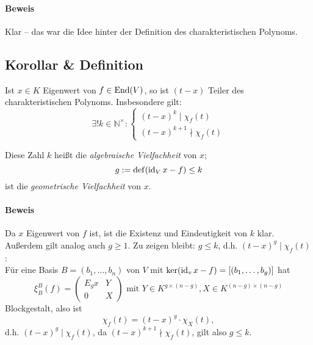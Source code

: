 \paragraph{Beweis}
	Klar -- das war die Idee hinter der Definition des charakteristischen Polynoms.
\subsection{Korollar \& Definition}
\begin{Korollar}
	Ist $ x\in K $ Eigenwert von $ f\in\operatorname{End}(V) $, so ist $ (t-x) $ Teiler des charakteristischen Polynoms. Insbesondere gilt:
		\[ \exists!k\in \mathbb{N}^\times:
			\begin{cases}
				(t-x)^k\mid \chi_f(t)\\
				(t-x)^{k+1}\nmid \chi_f(t)
			\end{cases} \]
\end{Korollar}
\begin{Definition}
	Diese Zahl $ k $ heißt die \emph{algebraische Vielfachheit} von $ x $;
		\[ g:= \operatorname{def}(\operatorname{id}_Vx-f) \leq k \]
	ist die \emph{geometrische Vielfachheit} von $ x $.
\end{Definition}
\paragraph{Beweis}
	Da $ x $ Eigenwert von $ f $ ist, ist die Existenz und Eindeutigkeit von $ k $ klar. Außerdem gilt analog auch $ g\geq 1 $.
	Zu zeigen bleibt: $ g\leq k $, d.h. $ (t-x)^g \mid \chi_f(t) $:\\
	Für eine Basis $ B = (b_1,\dots,b_n) $ von $ V $ mit
	$ \ker (\operatorname{id}_v x - f) = [(b_1,\dots,b_g)]$
	hat
		\[ \xi_B^B(f) =
		\begin{pmatrix}
			E_gx & Y\\
			0 & X
		\end{pmatrix}
		\text{ mit } Y\in K^{g\times (n-g)}, X\in K^{(n-g)\times(n-g)} \]
	Blockgestalt, also ist
		\[ \chi_f(t)=(t-x)^g\cdot \chi_X(t), \]
	d.h. $ (t-x)^g \mid \chi_f(t)$, da $ (t-x)^{k+1}\nmid \chi_f(t) $, gilt also $ g\leq k $.
